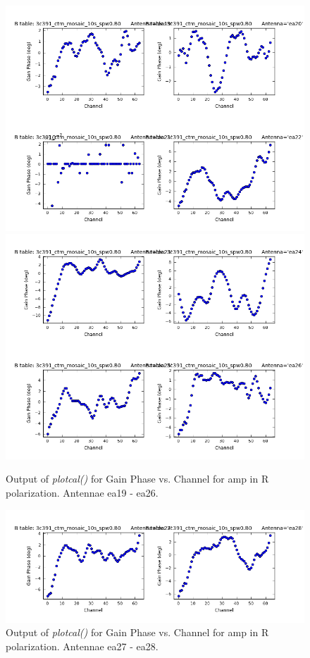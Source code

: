 \documentclass[12pt, a4paper]{article}
\begin{document}
\begin{figure}[h!]
\centering
\includegraphics[scale=0.65]{../Imaging/plots2/part4-subE-question3b_phase_pol-R-ea19-ea22.png}
\includegraphics[scale=0.65]{../Imaging/plots2/part4-subE-question3b_phase_pol-R-ea23-ea26.png}
\caption{Output of \emph{plotcal()} for Gain Phase vs. Channel for amp in R polarization. Antennae ea19 - ea26.}
\end{figure}
\addtocounter{figure}{-1}

\begin{figure}[h!]
\centering
\includegraphics[scale=0.65]{../Imaging/plots2/part4-subE-question3b_phase_pol-R-ea27-ea28.png}
\caption{Output of \emph{plotcal()} for Gain Phase vs. Channel for amp in R polarization. Antennae ea27 - ea28. \label{fig:part4subE-q3b-phase-R}}
\end{figure}
\newpage
\end{document}
